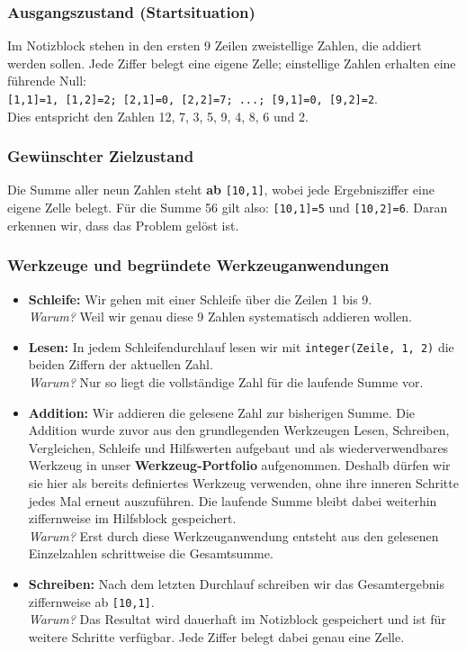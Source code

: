 \documentclass{article}
\begin{document}
    \subsubsection{Ausgangszustand (Startsituation)}
    Im Notizblock stehen in den ersten 9 Zeilen zweistellige Zahlen, die addiert werden sollen. Jede Ziffer belegt eine eigene Zelle; einstellige Zahlen erhalten eine führende Null:\\
    		\texttt{[1,1]=1, [1,2]=2; [2,1]=0, [2,2]=7; ...; [9,1]=0, [9,2]=2}.\\
    Dies entspricht den Zahlen 12, 7, 3, 5, 9, 4, 8, 6 und 2.

    \subsubsection{Gewünschter Zielzustand}
    Die Summe aller neun Zahlen steht \textbf{ab} \texttt{[10,1]}, wobei jede Ergebnisziffer eine eigene Zelle belegt. Für die Summe 56 gilt also: \texttt{[10,1]=5} und \texttt{[10,2]=6}. Daran erkennen wir, dass das Problem gelöst ist.

    \subsubsection{Werkzeuge und begründete Werkzeuganwendungen}
    \begin{itemize}
      \item \textbf{Schleife:} Wir gehen mit einer Schleife über die Zeilen 1 bis 9.\\
      \emph{Warum?} Weil wir genau diese 9 Zahlen systematisch addieren wollen.

      \item \textbf{Lesen:} In jedem Schleifendurchlauf lesen wir mit \texttt{integer(Zeile, 1, 2)} die beiden Ziffern der aktuellen Zahl.\\
      \emph{Warum?} Nur so liegt die vollständige Zahl für die laufende Summe vor.

      \item \textbf{Addition:} Wir addieren die gelesene Zahl zur bisherigen Summe. Die Addition wurde zuvor aus den grundlegenden Werkzeugen Lesen, Schreiben, Vergleichen, Schleife und Hilfswerten aufgebaut und als wiederverwendbares Werkzeug in unser \textbf{Werkzeug-Portfolio} aufgenommen. Deshalb dürfen wir sie hier als bereits definiertes Werkzeug verwenden, ohne ihre inneren Schritte jedes Mal erneut auszuführen. Die laufende Summe bleibt dabei weiterhin ziffernweise im Hilfsblock gespeichert.\\
      \emph{Warum?} Erst durch diese Werkzeuganwendung entsteht aus den gelesenen Einzelzahlen schrittweise die Gesamtsumme.

      \item \textbf{Schreiben:} Nach dem letzten Durchlauf schreiben wir das Gesamtergebnis ziffernweise ab \texttt{[10,1]}.\\
      \emph{Warum?} Das Resultat wird dauerhaft im Notizblock gespeichert und ist für weitere Schritte verfügbar. Jede Ziffer belegt dabei genau eine Zelle.
    \end{itemize}
\end{document}
